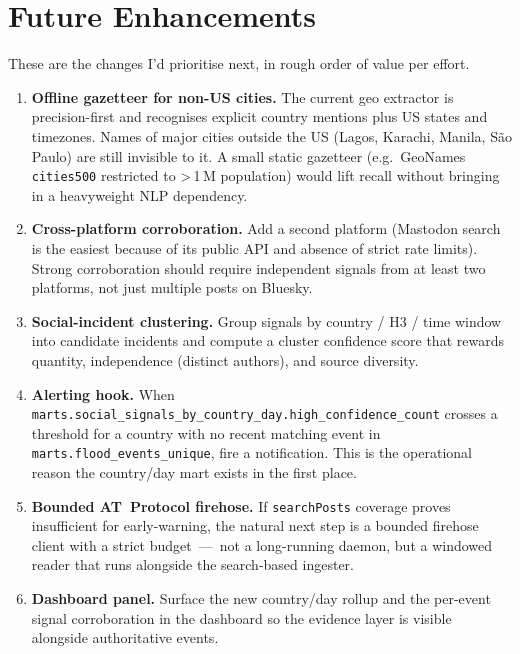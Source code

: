 \documentclass[11pt]{article}
\begin{document}
\section{Future Enhancements}

These are the changes I'd prioritise next, in rough order of value per
effort.

\begin{enumerate}[leftmargin=*]
  \item \textbf{Offline gazetteer for non-US cities.} The current geo
        extractor is precision-first and recognises explicit country
        mentions plus US states and timezones. Names of major cities
        outside the US (Lagos, Karachi, Manila, S\~ao Paulo) are still
        invisible to it. A small static gazetteer (e.g.\ GeoNames
        \texttt{cities500} restricted to >\,1\,M population) would lift
        recall without bringing in a heavyweight NLP dependency.
  \item \textbf{Cross-platform corroboration.} Add a second platform
        (Mastodon search is the easiest because of its public API and
        absence of strict rate limits). Strong corroboration should
        require independent signals from at least two platforms, not
        just multiple posts on Bluesky.
  \item \textbf{Social-incident clustering.} Group signals by
        country / H3 / time window into candidate incidents and
        compute a cluster confidence score that rewards quantity,
        independence (distinct authors), and source diversity.
  \item \textbf{Alerting hook.} When
        \texttt{marts.social\_signals\_by\_country\_day.high\_confidence\_count}
        crosses a threshold for a country with no recent matching
        event in \texttt{marts.flood\_events\_unique}, fire a
        notification. This is the operational reason the country/day
        mart exists in the first place.
  \item \textbf{Bounded AT~Protocol firehose.} If \texttt{searchPosts}
        coverage proves insufficient for early-warning, the natural
        next step is a bounded firehose client with a strict
        budget~---~not a long-running daemon, but a windowed reader
        that runs alongside the search-based ingester.
  \item \textbf{Dashboard panel.} Surface the new country/day rollup
        and the per-event signal corroboration in the dashboard so the
        evidence layer is visible alongside authoritative events.
\end{enumerate}
\end{document}
